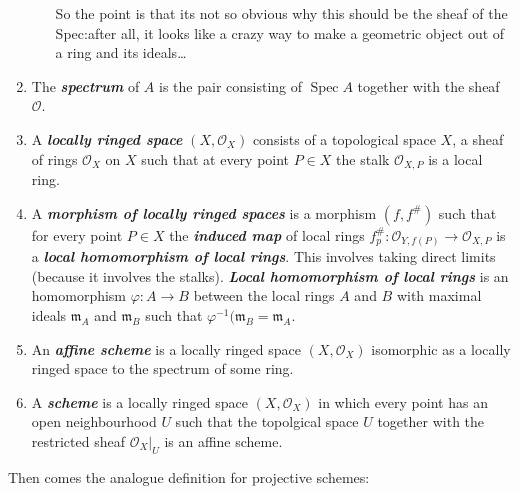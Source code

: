 \documentclass{article}
\begin{document}
\begin{defn}[Scheme]
\begin{enumerate}
\begin{itemize}
					{\color{azure}So the point is that its not so obvious why this should be the sheaf of the Spec:after all, it looks like a crazy way to make a geometric object out of a ring and its ideals…}
			\end{itemize}
		\item The \textit{\textbf{spectrum}} of $A$ is the pair consisting of $\operatorname{Spec}A$ together with the sheaf $\mathcal{O}$.
		\item A \textit{\textbf{locally ringed space}} $\left( X,\mathcal{O}_{X} \right) $ consists of a topological space $X$, a sheaf of rings $\mathcal{O}_{X}$ on $X$ such that at every point $P\in X$ the stalk $\mathcal{O}_{X,P}$ is a local ring.
		\item A \textit{\textbf{morphism of locally ringed spaces}}  is a morphism  $\left( f,f^{\#} \right) $ such that for every point $P\in X$ the \textit{\textbf{induced map}} of local rings $f^{\#}_{p}:\mathcal{O}_{Y,f(P)}\to \mathcal{O}_{X,P}$ is a \textit{\textbf{local homomorphism of local rings}}. This involves taking direct limits (because it involves the stalks). \textit{\textbf{Local homomorphism of local rings}} is an homomorphism $\varphi:A\to B$ between the local rings $A$ and $B$ with maximal ideals $\mathfrak{m}_A$ and $\mathfrak{m}_B$ such that $\varphi^{-1}(\mathfrak{m}_B=\mathfrak{m}_A$.

		\item An \textit{\textbf{affine scheme}} is a locally ringed space $(X,\mathcal{O}_X)$ isomorphic as a locally ringed space to the spectrum of some ring.
		\item A \textit{\textbf{scheme}} is a locally ringed space $\left( X,\mathcal{O}_X \right) $ in which every point has an open neighbourhood $U$ such that the topolgical space $U$ together with the restricted sheaf $\mathcal{O}_X|_U$ is an affine scheme.
	\end{enumerate}
\end{defn}
Then comes the analogue definition for projective schemes:
\end{document}
